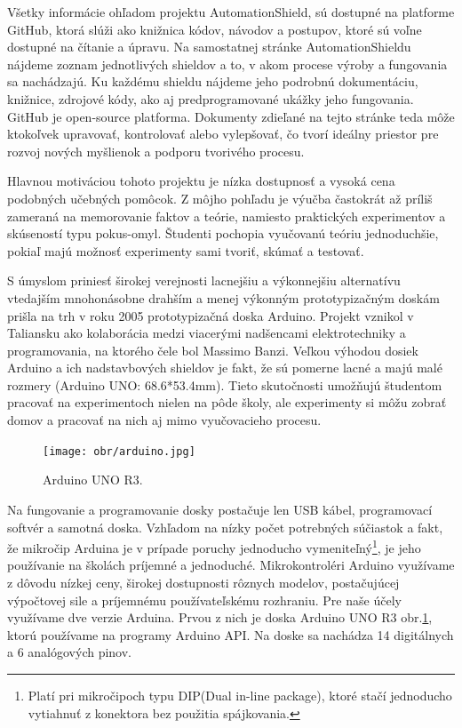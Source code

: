 Všetky informácie ohľadom projektu AutomationShield, sú dostupné na platforme GitHub\cite{Git}, ktorá slúži ako knižnica kódov, návodov a postupov, ktoré sú voľne dostupné na čítanie a úpravu. Na samostatnej stránke AutomationShieldu nájdeme zoznam jednotlivých shieldov a to, v akom procese výroby a fungovania sa nachádzajú. Ku každému shieldu nájdeme jeho podrobnú dokumentáciu, knižnice, zdrojové kódy, ako aj predprogramované ukážky jeho fungovania. GitHub je open-source platforma. Dokumenty zdieľané na tejto stránke teda môže ktokoľvek upravovať, kontrolovať alebo vylepšovať, čo tvorí ideálny priestor pre rozvoj nových myšlienok a podporu tvorivého procesu.

\newpage
Hlavnou motiváciou tohoto projektu je nízka dostupnosť a vysoká cena podobných učebných pomôcok. Z môjho pohľadu je výučba častokrát až príliš zameraná na memorovanie faktov a teórie, namiesto praktických experimentov a skúseností typu pokus-omyl. Študenti pochopia vyučovanú teóriu jednoduchšie, pokiaľ majú možnosť experimenty sami tvoriť, skúmať a testovať\cite{Dhanapal2013ASO}. 

S úmyslom priniesť širokej verejnosti lacnejšiu a výkonnejšiu alternatívu vtedajším mnohonásobne drahším a menej výkonným prototypizačným doskám\cite{stamp} prišla na trh v roku 2005 prototypizačná doska Arduino. Projekt vznikol v Taliansku ako kolaborácia medzi viacerými nadšencami elektrotechniky a programovania, na ktorého čele bol Massimo Banzi. Veľkou výhodou dosiek Arduino a ich nadstavbových shieldov je fakt, že sú pomerne lacné a majú malé rozmery (Arduino UNO: 68.6*53.4mm\cite{UNO}). Tieto skutočnosti umožňujú študentom pracovať na experimentoch nielen na pôde školy, ale experimenty si môžu zobrať domov a pracovať na nich aj mimo vyučovacieho procesu. 

\begin{figure}[!tbh]
	\centering
	\texttt{[image: obr/arduino.jpg]}
	\caption{{Arduino UNO R3.\cite{UNOFOTO}}}\label{OBRAZOK 1.3}
\end{figure}

Na fungovanie a programovanie dosky postačuje len USB kábel, programovací softvér a samotná doska. Vzhľadom na nízky počet potrebných súčiastok a fakt, že mikročip Arduina je v prípade poruchy jednoducho vymeniteľný\footnote[2]{Platí pri mikročipoch typu DIP(Dual in-line package), ktoré stačí jednoducho vytiahnuť z konektora bez použitia spájkovania.}, je jeho používanie na školách príjemné a jednoduché. Mikrokontroléri Arduino využívame z dôvodu nízkej ceny, širokej dostupnosti rôznych modelov, postačujúcej výpočtovej sile a príjemnému používateľskému rozhraniu. Pre naše účely využívame dve verzie Arduina. Prvou z nich je doska Arduino UNO R3  obr.\ref{OBRAZOK 1.3}, ktorú používame na programy Arduino API. Na doske sa nachádza 14 digitálnych a 6 analógových pinov.

